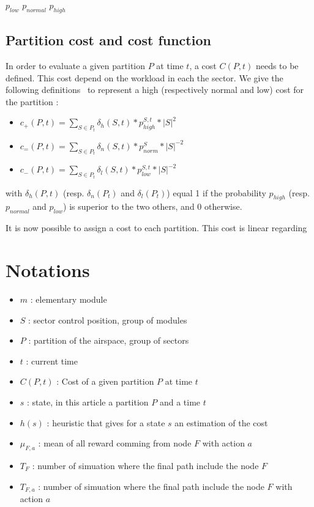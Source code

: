 \documentclass[twoside,twocolumn]{article}
\begin{document}
$p_{low}$
$p_{normal}$
$p_{high}$

\subsection{Partition cost and cost function}

In order to evaluate a given partition $P$ at time $t$, a cost $C(P, t)$ needs
to be defined. This cost depend on the workload in each the sector. We give the
following definitions~\cite{Ferrari2017} to represent a high (respectively normal
and low) cost for the partition :
\begin{itemize}
    \item $c_+(P, t) = \sum_{S \in P_t} \delta_{h}(S, t) * p_{high}^{S, t} * |S|^2$
    \item $c_=(P, t) = \sum_{S \in P_t} \delta_{n}(S, t) * p_{norm}^{S} * |S|^{-2}$
    \item $c_-(P, t) = \sum_{S \in P_t} \delta_{l}(S, t) * p_{low}^{S, t} * |S|^{-2}$
\end{itemize}
with $\delta_{h}(P, t)$ (resp. $\delta_{n}(P_t)$ and $\delta_{l}(P_t)$) equal 1
if the probability $p_{high}$ (resp. $p_{normal}$ and $p_{low}$) is superior to
the two others, and 0 otherwise.

It is now possible to assign a cost to each partition. This cost is linear
regarding

\section*{Notations}

\begin{itemize}
    \item $m$ : elementary module
    \item $S$ : sector control position, group of modules
    \item $P$ : partition of the airspace, group of sectors
    \item $t$ : current time
    \item $C(P, t)$ : Cost of a given partition $P$ at time $t$
    \item $s$ : state, in this article a partition $P$ and a time $t$
    \item $h(s)$ : heuristic that gives for a state $s$ an estimation of the cost
    \item $\mu_{F, a}$ : mean of all reward comming from node $F$ with action $a$
    \item $T_F$ : number of simuation where the final path include the node $F$
    \item $T_{F, a}$ : number of simuation where the final path include the node $F$ with action $a$
\end{itemize}




\end{document}
